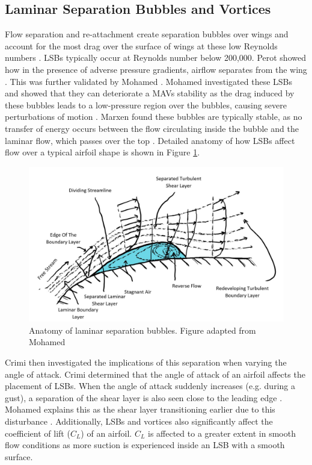\subsection{Laminar Separation Bubbles and Vortices}
Flow separation and re-attachment create separation bubbles over wings and account for the most drag over the surface of wings at these low Reynolds numbers \cite{ravi}. LSBs typically occur at Reynolds number below 200,000. Perot showed how in the presence of adverse pressure gradients, airflow separates from the wing \cite{Perot1999}. This was further validated by Mohamed \cite{Mohamed2014}. Mohamed investigated these LSBs and showed that they can deteriorate a MAVs stability as the drag induced by these bubbles leads to a low-pressure region over the bubbles, causing severe perturbations of motion \cite{Mohamed2014}. Marxen found these bubbles are typically stable, as no transfer of energy occurs between the flow circulating inside the bubble and the laminar flow, which passes over the top \cite{Marxen2010}. Detailed anatomy of how LSBs affect flow over a typical airfoil shape is shown in Figure \ref{fig:Laminar}.


\begin{figure}[H]
  \centering
   \includegraphics[width=\linewidth]{03_LiteratureReview/Figs/LSB.jpg}
  \caption{Anatomy of laminar separation bubbles. Figure adapted from Mohamed \cite{Mohamed2014}}
  \label{fig:Laminar}
\end{figure}

Crimi then investigated the implications of this separation when varying the angle of attack. Crimi determined that the angle of attack of an airfoil affects the placement of LSBs. When the angle of attack suddenly increases (e.g. during a gust), a separation of the shear layer is also seen close to the leading edge \cite{Crimi1976}. Mohamed explains this as the shear layer transitioning earlier due to this disturbance  \cite{Mohamed2014}. Additionally, LSBs and vortices also significantly affect the coefficient of lift ($C_L$) of an airfoil. $C_L$ is affected to a greater extent in smooth flow conditions as more suction is experienced inside an LSB with a smooth surface.


